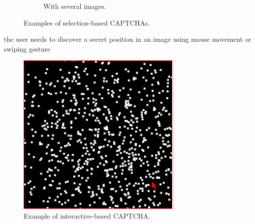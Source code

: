 \begin{itemize}
{\begin{figure}[h]
\begin{subfigure}[b]{0.48\textwidth}
         \caption{\footnotesize{With several images.}}
        \label{soa:selection2}
     \end{subfigure}
     \caption{\footnotesize{Examples of selection-based CAPTCHAs.}}
\end{figure}
}
{the user needs to discover a secret position in an image using mouse movement or swiping gesture
\begin{figure}[h]
     \centering
     \includegraphics[width=.45\linewidth]{Images/StateOfArt/interactive_CAPTCHA}
     \caption{\footnotesize{Example of interactive-based CAPTCHA.}}\label{soa:interactive_CAPTCHA}
\end{figure}
}
\end{itemize}

